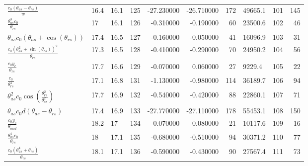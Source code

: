 \begin{tabularx}{\textwidth}{lllrrrrlrr}
$ \displaystyle\frac{c_{0} \left(\theta_{as} - \theta_{rs}\right)}{w} $  &  16.4  &  16.1  &  125  &  -27.230000  &  -26.710000  &  172  &  49665.1  &  101\phantom{.000000}  &  145\phantom{.000000}  \\ 
$ \displaystyle\frac{\theta_{as}^{3} c_{0}}{\theta_{rs}} $  &  17\phantom{.0}  &  16.1  &  126  &  -0.310000  &  -0.190000  &  60  &  23500.6  &  102\phantom{.000000}  &  46\phantom{.000000}  \\ 
$ \theta_{as} c_{0} \left(\theta_{as} + \cos{\left(\theta_{rs} \right)}\right) $  &  17.4  &  16.5  &  127  &  -0.160000  &  -0.050000  &  41  &  16096.9  &  103\phantom{.000000}  &  31\phantom{.000000}  \\ 
$ \displaystyle\frac{c_{0} \left(\theta_{as}^{2} + \sin{\left(\theta_{rs} \right)}\right)^{2}}{\theta_{rs}} $  &  17.3  &  16.5  &  128  &  -0.410000  &  -0.290000  &  70  &  24950.2  &  104\phantom{.000000}  &  56\phantom{.000000}  \\ 
$ \displaystyle\frac{c_{0} y_c}{\theta_{rs}} $  &  17.7  &  16.6  &  129  &  -0.070000  &  0.060000  &  27  &  9229.4  &  105\phantom{.000000}  &  22\phantom{.000000}  \\ 
$ \displaystyle\frac{c_{0}}{\theta_{rs}^{4}} $  &  17.1  &  16.8  &  131  &  -1.130000  &  -0.980000  &  114  &  36189.7  &  106\phantom{.000000}  &  94\phantom{.000000}  \\ 
$ \theta_{as}^{2} c_{0} \cos{\left(\displaystyle\frac{\theta_{rs}^{2}}{\theta_{as}^{2}} \right)} $  &  17.7  &  16.9  &  132  &  -0.540000  &  -0.420000  &  88  &  22860.1  &  107\phantom{.000000}  &  71\phantom{.000000}  \\ 
$ \theta_{as} c_{0} d \left(\theta_{as} - \theta_{rs}\right) $  &  17.4  &  16.9  &  133  &  -27.770000  &  -27.110000  &  178  &  55453.1  &  108\phantom{.000000}  &  150\phantom{.000000}  \\ 
$ \displaystyle\frac{c_{0} y_c}{\theta_{mid}} $  &  18.2  &  17\phantom{.0}  &  134  &  -0.070000  &  0.080000  &  21  &  10117.6  &  109\phantom{.000000}  &  16\phantom{.000000}  \\ 
$ \displaystyle\frac{\theta_{as}^{4} c_{0}}{\theta_{rs}} $  &  18\phantom{.0}  &  17.1  &  135  &  -0.680000  &  -0.510000  &  94  &  30371.2  &  110\phantom{.000000}  &  77\phantom{.000000}  \\ 
$ \displaystyle\frac{c_{0} \left(\theta_{as}^{4} + \theta_{rs}\right)}{\theta_{rs}} $  &  18.1  &  17.1  &  136  &  -0.590000  &  -0.430000  &  90  &  27567.4  &  111\phantom{.000000}  &  73\phantom{.000000}  \\ 

\end{tabularx}
